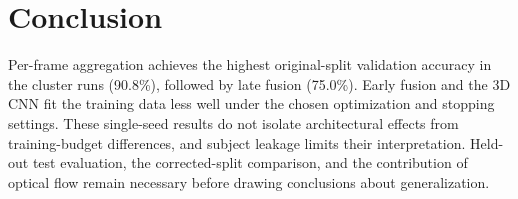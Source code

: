 \section{Conclusion}
\label{sec:conclusion}
Per-frame aggregation achieves the highest original-split validation
accuracy in the cluster runs (90.8\%), followed by late fusion (75.0\%).
Early fusion and the 3D CNN fit the training data less well under the
chosen optimization and stopping settings. These single-seed results do
not isolate architectural effects from training-budget differences, and
subject leakage limits their interpretation. Held-out test evaluation,
the corrected-split comparison, and the contribution of optical flow
remain necessary before drawing conclusions about generalization.
